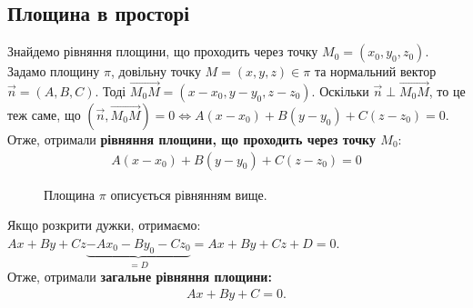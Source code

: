 \documentclass[a4paper, 10pt]{extarticle}
\theoremstyle{theoremdd}
\theoremstyle{theoremdd}
\theoremstyle{theoremdd}
\theoremstyle{theoremdd}
\theoremstyle{theoremdd}
\theoremstyle{theoremdd}
\theoremstyle{theoremdd}
\theoremstyle{theoremdd}
\begin{document}
\subsection{Площина в просторі}
Знайдемо рівняння площини, що проходить через точку $M_0 = (x_0,y_0,z_0)$.\\
Задамо площину $\pi$, довільну точку $M = (x,y,z) \in \pi$ та нормальний вектор $\vec{n} = (A,B,C)$. Тоді $\overrightarrow{M_0M} = (x-x_0, y-y_0, z-z_0)$. Оскільки $\vec{n} \perp \overrightarrow{M_0 M}$, то це теж саме, що $(\vec{n}, \overrightarrow{M_0 M}) = 0 \iff A(x-x_0)+B(y-y_0)+C(z-z_0)=0$.\\
Отже, отримали \textbf{рівняння площини, що проходить через точку $M_0$}:
\begin{align*}
A(x-x_0) + B(y-y_0) + C(z-z_0) = 0
\end{align*}

\begin{figure}[H]
\centering
{}
\caption*{Площина $\pi$ описується рівнянням вище.}
\end{figure}

Якщо розкрити дужки, отримаємо:\\
$Ax + By + Cz \underbrace{-Ax_0 - By_0 - Cz_0}_{= D} = Ax+By+Cz+D = 0$.\\
Отже, отримали \textbf{загальне рівняння площини:}
\begin{align*}
Ax + By + C = 0.
\end{align*}
\end{document}
